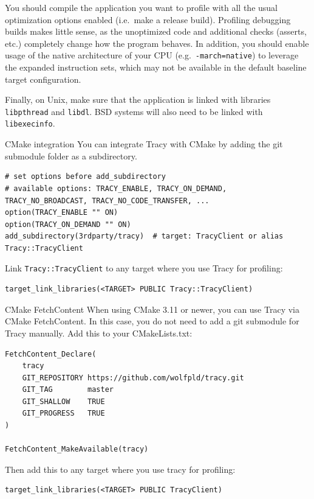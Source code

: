 \documentclass[hidelinks,titlepage,a4paper]{article}
\begin{document}
You should compile the application you want to profile with all the usual optimization options enabled (i.e.~make a release build). Profiling debugging builds makes little sense, as the unoptimized code and additional checks (asserts, etc.) completely change how the program behaves. In addition, you should enable usage of the native architecture of your CPU (e.g.~\texttt{-march=native}) to leverage the expanded instruction sets, which may not be available in the default baseline target configuration.

Finally, on Unix, make sure that the application is linked with libraries \texttt{libpthread} and \texttt{libdl}. BSD systems will also need to be linked with \texttt{libexecinfo}.

\begin{bclogo}[
noborder=true,
couleur=black!5,
logo=\bclampe
]{CMake integration}
You can integrate Tracy with CMake by adding the git submodule folder as a subdirectory.

\begin{lstlisting}
# set options before add_subdirectory
# available options: TRACY_ENABLE, TRACY_ON_DEMAND, TRACY_NO_BROADCAST, TRACY_NO_CODE_TRANSFER, ...
option(TRACY_ENABLE "" ON)
option(TRACY_ON_DEMAND "" ON)
add_subdirectory(3rdparty/tracy)  # target: TracyClient or alias Tracy::TracyClient
\end{lstlisting}

Link \texttt{Tracy::TracyClient} to any target where you use Tracy for profiling:

\begin{lstlisting}
target_link_libraries(<TARGET> PUBLIC Tracy::TracyClient)
\end{lstlisting}
\end{bclogo}

\begin{bclogo}[
noborder=true,
couleur=black!5,
logo=\bclampe
]{CMake FetchContent}
When using CMake 3.11 or newer, you can use Tracy via CMake FetchContent. In this case, you do not need to add a git submodule for Tracy manually. Add this to your CMakeLists.txt:

\begin{lstlisting}
FetchContent_Declare(
    tracy
    GIT_REPOSITORY https://github.com/wolfpld/tracy.git
    GIT_TAG        master
    GIT_SHALLOW    TRUE
    GIT_PROGRESS   TRUE
)

FetchContent_MakeAvailable(tracy)
\end{lstlisting}

Then add this to any target where you use tracy for profiling:

\begin{lstlisting}
target_link_libraries(<TARGET> PUBLIC TracyClient)
\end{lstlisting}
\end{bclogo}
\end{document}
